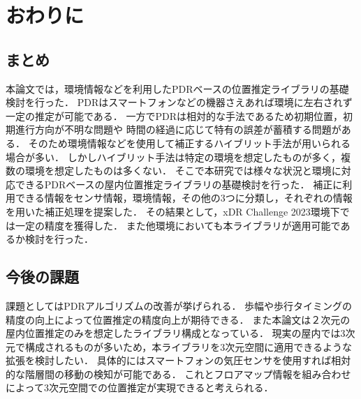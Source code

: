 \chapter{おわりに}
\thispagestyle{myheadings}


\section{まとめ}
本論文では，環境情報などを利用したPDRベースの位置推定ライブラリの基礎検討を行った．
PDRはスマートフォンなどの機器さえあれば環境に左右されず一定の推定が可能である．
一方でPDRは相対的な手法であるため初期位置，初期進行方向が不明な問題や
時間の経過に応じて特有の誤差が蓄積する問題がある．
そのため環境情報などを使用して補正するハイブリット手法が用いられる場合が多い．
しかしハイブリット手法は特定の環境を想定したものが多く，複数の環境を想定したものは多くない．
そこで本研究では様々な状況と環境に対応できるPDRベースの屋内位置推定ライブラリの基礎検討を行った．
補正に利用できる情報をセンサ情報，環境情報，その他の3つに分類し，それぞれの情報を用いた補正処理を提案した．
その結果として，xDR Challenge 2023環境下では一定の精度を獲得した．
また他環境においても本ライブラリが適用可能であるか検討を行った．


\section{今後の課題}
課題としてはPDRアルゴリズムの改善が挙げられる．
歩幅や歩行タイミングの精度の向上によって位置推定の精度向上が期待できる．
また本論文は２次元の屋内位置推定のみを想定したライブラリ構成となっている．
現実の屋内では3次元で構成されるものが多いため，本ライブラリを3次元空間に適用できるような拡張を検討したい．
具体的にはスマートフォンの気圧センサを使用すれば相対的な階層間の移動の検知が可能である．
これとフロアマップ情報を組み合わせによって3次元空間での位置推定が実現できると考えられる．

